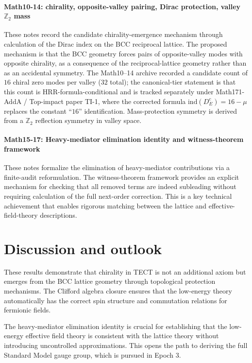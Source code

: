 \paragraph{Math10-14: chirality, opposite-valley pairing, Dirac protection, valley $\mathbb{Z}_2$ mass}
These notes record the candidate chirality-emergence mechanism through
calculation of the Dirac index on the BCC reciprocal lattice. The
proposed mechanism is that the BCC geometry forces pairs of
opposite-valley modes with opposite chirality, as a consequence of the
reciprocal-lattice geometry rather than as an accidental symmetry. The
Math10--14 archive recorded a candidate count of $16$ chiral zero modes
per valley ($32$ total); the canonical-tier statement is that this
count is HRR-formula-conditional and is tracked separately under
Math171-AddA / Top-impact paper TI-1, where the corrected formula
$\mathrm{ind}(D_E^c) = 16 - \mu$ replaces the constant ``$16$''
identification. Mass-protection symmetry is derived from a $\mathbb{Z}_2$
reflection symmetry in valley space.
\cite{Math10, Math11, Math12, Math13, Math14}

\paragraph{Math15-17: Heavy-mediator elimination identity and witness-theorem framework}
These notes formalize the elimination of heavy-mediator contributions via a finite-audit
reformulation. The witness-theorem framework provides an explicit mechanism for checking
that all removed terms are indeed subleading without requiring calculation of the full
next-order correction. This is a key technical achievement that enables rigorous matching
between the lattice and effective-field-theory descriptions. \cite{Math15, Math16, Math17}

\section{Discussion and outlook}
These results demonstrate that chirality in TECT is not an additional axiom but emerges
from the BCC lattice geometry through topological protection mechanisms. The Clifford
algebra closure ensures that the low-energy theory automatically has the correct spin
structure and commutation relations for fermionic fields.

The heavy-mediator elimination identity is crucial for establishing that the low-energy
effective field theory is consistent with the lattice theory without introducing uncontrolled
approximations. This opens the path to deriving the full Standard Model gauge group,
which is pursued in Epoch 3.

